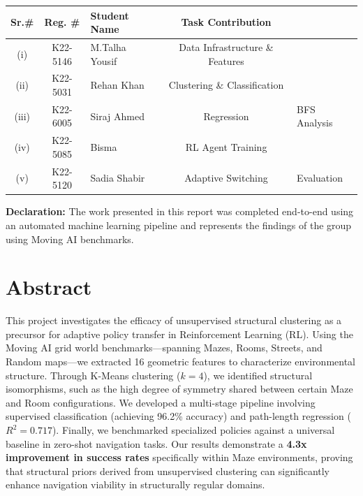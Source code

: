 \documentclass[12pt,a4paper]{article}
\begin{document}
\begin{tabular}{|c|c|p{4.5cm}|c|}
\hline
\textbf{Sr.\#} & \textbf{Reg. \#} & \textbf{Student Name} & \textbf{Task Contribution} \\
\hline
(i)   & K22-5146 & M.Talha Yousif & Data Infrastructure \& Features \\
\hline
(ii)  & K22-5031 & Rehan Khan     & Clustering \& Classification \\
\hline
(iii) & K22-6005 & Siraj Ahmed    & Regression & BFS Analysis \\
\hline
(iv)  & K22-5085 & Bisma          & RL Agent Training \\
\hline
(v)   & K22-5120 & Sadia Shabir   & Adaptive Switching & Evaluation \\
\hline
\end{tabular}


\vspace{0.5cm}

\textbf{Declaration:} The work presented in this report was completed end-to-end using an automated machine learning pipeline and represents the findings of the group using Moving AI benchmarks.

\newpage

\section*{Abstract}

This project investigates the efficacy of unsupervised structural clustering as a precursor for adaptive policy transfer in Reinforcement Learning (RL). Using the Moving AI grid world benchmarks—spanning Mazes, Rooms, Streets, and Random maps—we extracted 16 geometric features to characterize environmental structure. Through K-Means clustering ($k=4$), we identified structural isomorphisms, such as the high degree of symmetry shared between certain Maze and Room configurations. We developed a multi-stage pipeline involving supervised classification (achieving 96.2\% accuracy) and path-length regression ($R^2 = 0.717$). Finally, we benchmarked specialized policies against a universal baseline in zero-shot navigation tasks. Our results demonstrate a \textbf{4.3x improvement in success rates} specifically within Maze environments, proving that structural priors derived from unsupervised clustering can significantly enhance navigation viability in structurally regular domains.

\vspace{1cm}
\end{document}

